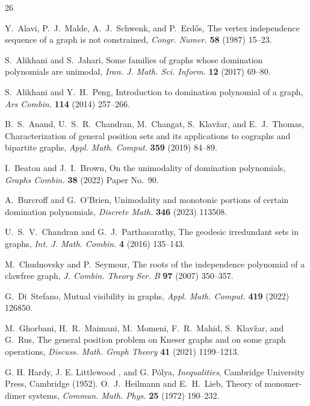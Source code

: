 \documentclass[12pt,twoside]{article}
\begin{document}
		\begin{thebibliography}{26}
			
			Y.~Alavi, P.~J.~Malde, A.~J.~Schwenk, and P.~Erd\H{o}s,
			The vertex independence sequence of a graph is not constrained,
			\emph{Congr. Numer.} \textbf{58} (1987) 15--23.
			
			S.~Alikhani and S.~Jahari,
			Some families of graphs whose domination polynomials are unimodal,
			\emph{Iran. J. Math. Sci. Inform.} \textbf{12} (2017) 69--80.
			
			S.~Alikhani and Y.~H.~Peng,
			Introduction to domination polynomial of a graph,
			\emph{Ars Combin.} \textbf{114} (2014) 257--266.
			
			B.~S.~Anand, U.~S.~R.~Chandran, M.~Changat, S.~Klav\v{z}ar, and E.~J.~Thomas,
			Characterization of general position sets and its applications to cographs and bipartite graphs,
			\emph{Appl. Math. Comput.} \textbf{359} (2019) 84--89.
			
			I.~Beaton and J.~I.~Brown,
			On the unimodality of domination polynomials,
			\emph{Graphs Combin.} \textbf{38} (2022) Paper No.~90.
			
			A.~Burcroff and G.~O'Brien,
			Unimodality and monotonic portions of certain domination polynomials,
			\emph{Discrete Math.} \textbf{346} (2023) 113508.
			
			U.~S.~V.~Chandran and G.~J.~Parthasarathy,
			The geodesic irredundant sets in graphs,
			\emph{Int. J. Math. Combin.} \textbf{4} (2016) 135--143.
			
			M.~Chudnovsky and P.~Seymour,
			The roots of the independence polynomial of a clawfree graph,
			\emph{J. Combin. Theory Ser. B} \textbf{97} (2007) 350--357.
			
			G.~Di~Stefano,
			Mutual visibility in graphs,
			\emph{Appl. Math. Comput.} \textbf{419} (2022) 126850.
			
			M.~Ghorbani, H.~R.~Maimani, M.~Momeni, F.~R.~Mahid, S.~Klav\v{z}ar, and G.~Rus,
			The general position problem on Kneser graphs and on some graph operations,
			\emph{Discuss. Math. Graph Theory} \textbf{41} (2021) 1199--1213.
			
			 G. H. Hardy, J. E. Littlewood , and G. Pólya, \textit{Inequalities}, Cambridge University Press, Cambridge (1952).
			O.~J.~Heilmann and E.~H.~Lieb,
			Theory of monomer-dimer systems,
			\emph{Commun. Math. Phys.} \textbf{25} (1972) 190--232.
			

\end{thebibliography}
\end{document}

